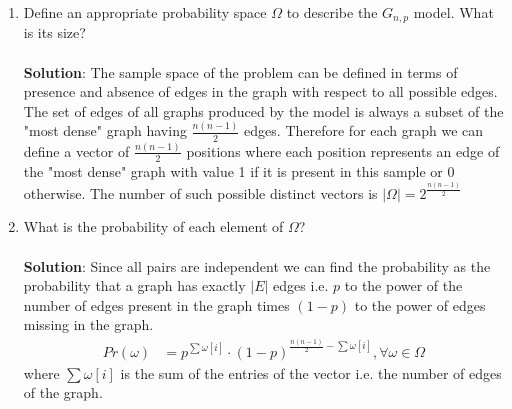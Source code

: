 \documentclass[a4paper]{article}
\begin{document}
\begin{enumerate}
    \item Define an appropriate probability space $\Omega$ to describe the $G_{n,p}$ model. What is
    its size? \\ \\
    \textbf{Solution}: The sample space of the problem can be defined in terms of presence and absence
    of edges in the graph with respect to all possible edges. The set of edges of all graphs produced by
    the model is always a subset of the "most dense" graph having $\frac{n(n-1)}{2}$ edges. Therefore for
    each graph we can define a vector of $\frac{n(n-1)}{2}$ positions where each position represents an edge of the "most dense" graph with value 1 if it is present in this sample or 0 otherwise. The number of such possible distinct vectors is $|\Omega| = 2^\frac{n(n-1)}{2}$
    
    \item What is the probability of each element of $\Omega$? \\ \\
    \textbf{Solution}: Since all pairs are independent we can find the probability as the probability that a graph has exactly $|E|$ edges i.e. $p$ to the power of
    the number of edges present in the graph times $(1-p)$ to the power of edges missing in the graph.
    \begin{align*}
     Pr(\omega) &= p^{\sum \omega[i]} \cdot (1-p)^{\frac{n(n-1)}{2} - \sum \omega[i]}, \text{}
           \forall \omega \in \Omega
    \end{align*}
    where $\sum \omega[i]$ is the sum of the entries of the vector i.e. the number of edges of the graph.
    

\end{enumerate}
\end{document}
